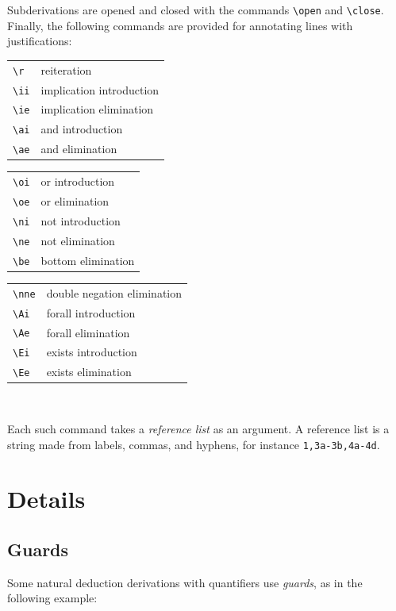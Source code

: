\documentclass[10pt]{article}
\begin{document}
Subderivations are opened and closed with the commands \verb!\open! and
\verb!\close!. Finally, the following commands are provided for
annotating lines with justifications:

\hfill
\begin{tabular}{ll}
  \verb!\r!  & reiteration \\
  \verb!\ii! & implication introduction \\
  \verb!\ie! & implication elimination \\
  \verb!\ai! & and introduction \\
  \verb!\ae! & and elimination \\
\end{tabular} 
\hfill
\begin{tabular}{ll}
  \verb!\oi! & or introduction \\
  \verb!\oe! & or elimination \\
  \verb!\ni! & not introduction \\
  \verb!\ne! & not elimination \\
  \verb!\be! & bottom elimination \\
\end{tabular} 
\hfill
\begin{tabular}{ll}
  \verb!\nne! & double negation elimination \\
  \verb!\Ai! & forall introduction \\
  \verb!\Ae! & forall elimination \\
  \verb!\Ei! & exists introduction \\
  \verb!\Ee! & exists elimination \\
\end{tabular} 
\hfill~

Each such command takes a {\em reference list} as an argument. A
reference list is a string made from labels, commas, and hyphens, for
instance \verb!1,3a-3b,4a-4d!.

\section{Details}

\subsection{Guards}

Some natural deduction derivations with quantifiers use {\em guards}, as in
the following example:
\end{document}
